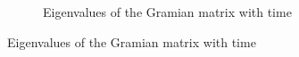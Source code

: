 \documentclass[12pt]{article}
\begin{document}
\begin{figure}[H]
\begin{subfigure}[t]{\textwidth}
        \caption{Eigenvalues of the Gramian matrix with time}
        \label{supfig:09c}
    \end{subfigure}
\end{figure}
\end{document}
